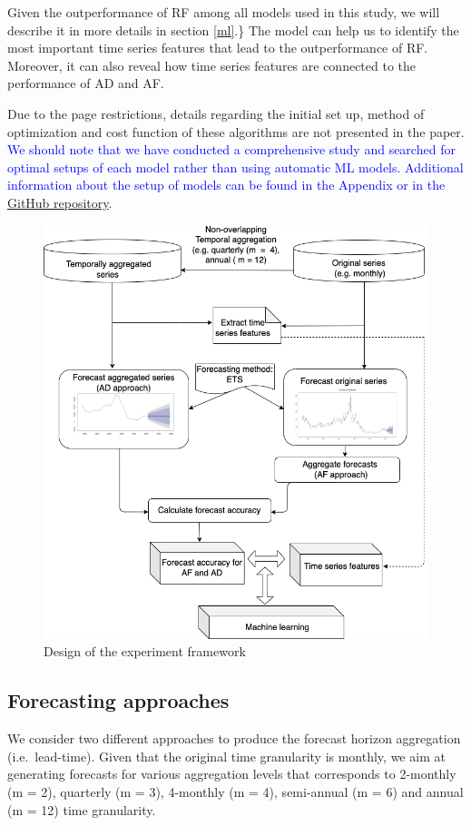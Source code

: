 \documentclass[preprint, 3p,
authoryear]{elsarticle} %
\begin{document}
Given the outperformance of RF among all models used in this study, we
will describe it in more details in section \ref{ml}.\} The model can
help us to identify the most important time series features that lead to
the outperformance of RF. Moreover, it can also reveal how time series
features are connected to the performance of AD and AF.

Due to the page restrictions, details regarding the initial set up,
method of optimization and cost function of these algorithms are not
presented in the paper.
\textcolor{blue}{We should note that we have conducted a comprehensive study and searched for optimal setups of each model rather than using automatic ML models. Additional information about the setup of models can be found in the Appendix or in the}
\href{https://github.com/bahmanrostamitabar/time-searies-featute-temporal-aggregation}{GitHub
repository}.

\begin{figure}[H]

{\centering \includegraphics[width=0.7\linewidth]{img/experiment_design} 

}

\caption{Design of the experiment framework}\label{fig:expdes}
\end{figure}

\hypertarget{forecasting-approaches}{%
\subsection{Forecasting approaches}\label{forecasting-approaches}}

We consider two different approaches to produce the forecast horizon
aggregation (i.e.~lead-time). Given that the original time granularity
is monthly, we aim at generating forecasts for various aggregation
levels that corresponds to 2-monthly (m = 2), quarterly (m = 3),
4-monthly (m = 4), semi-annual (m = 6) and annual (m = 12) time
granularity.
\end{document}
